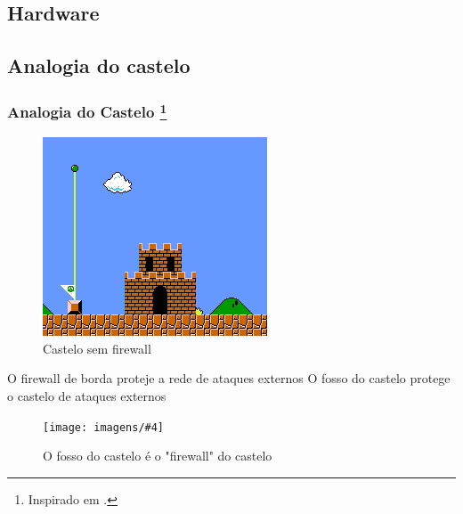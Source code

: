 
\subsection{Hardware}







\subsection{Analogia do castelo}

\begin{frame}
	\frametitle{Analogia do Castelo \footnote{Inspirado em \cite{talal}.}}

	\begin{figure}
		\centering
		\includegraphics[height=.75\textheight]{imagens/castelo-mario.png}
		\caption{Castelo sem firewall}
	\end{figure}

\end{frame}

\newcommand{\analogia}[5][height=.5\textheight]{
	\begin{frame}
	\begin{block}{#2}
		#3
		\begin{figure}
			\centering
			\texttt{[image: imagens/\#4]}
			\caption{#5}
		\end{figure}
	\end{block}
	\end{frame}
}
\analogia	{O firewall de borda proteje a rede de ataques externos}
		{O fosso do castelo protege o castelo de ataques externos}
		{castelo.jpg}
		{O fosso do castelo é o "firewall" do castelo}

